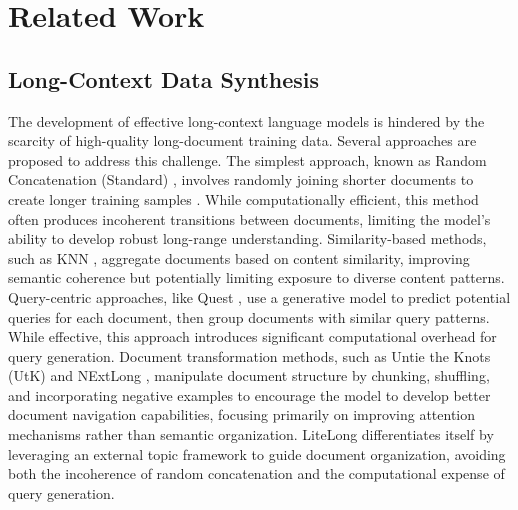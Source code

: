 \documentclass{article}
\theoremstyle{plain}
\theoremstyle{definition}
\theoremstyle{remark}
\begin{document}
\section{Related Work}

\subsection{Long-Context Data Synthesis}

    The development of effective long-context language models is hindered by the scarcity of high-quality long-document training data. Several approaches are proposed to address this challenge. The simplest approach, known as Random Concatenation (Standard) \cite{ouyang2022training}, involves randomly joining shorter documents to create longer training samples \cite{xiong2023effective}. While computationally efficient, this method often produces incoherent transitions between documents, limiting the model's ability to develop robust long-range understanding. Similarity-based methods, such as KNN \cite{jiang2023longllmlingua}, aggregate documents based on content similarity, improving semantic coherence but potentially limiting exposure to diverse content patterns. Query-centric approaches, like Quest \cite{gao2025quest}, use a generative model to predict potential queries for each document, then group documents with similar query patterns. While effective, this approach introduces significant computational overhead for query generation. Document transformation methods, such as Untie the Knots (UtK) \cite{tian2024untie} and NExtLong \cite{gao2025nextlong}, manipulate document structure by chunking, shuffling, and incorporating negative examples to encourage the model to develop better document navigation capabilities, focusing primarily on improving attention mechanisms rather than semantic organization. LiteLong differentiates itself by leveraging an external topic framework to guide document organization, avoiding both the incoherence of random concatenation and the computational expense of query generation.
\end{document}
